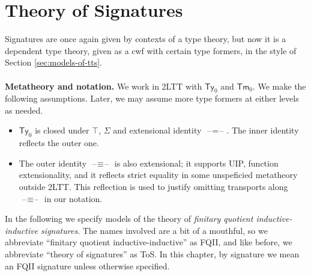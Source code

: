 \documentclass[12pt,a4paper,twoside,openany]{book}
\theoremstyle{remark}
\theoremstyle{definition}
\theoremstyle{theorem}
\newcommand{\Tm}{\mathsf{Tm}}
\newcommand{\Ty}{\mathsf{Ty}}
\newcommand{\blank}{\mathord{\hspace{1pt}\text{--}\hspace{1pt}}}
\begin{document}
\section{Theory of Signatures}
\label{sec:fqiit-tos}

Signatures are once again given by contexts of a type theory, but now it is a
dependent type theory, given as a cwf with certain type formers, in the style
of Section \ref{sec:models-of-tts}.
\\\\
\textbf{Metatheory and notation.} We work in 2LTT with $\Ty_0$ and $\Tm_0$. We
make the following assumptions. Later, we may assume more type formers at either
levels as needed.
\begin{itemize}
  \item $\Ty_0$ is closed under $\top$, $\Sigma$ and extensional identity $\blank\!=\!\blank$.
        The inner identity reflects the outer one.
  \item The outer identity $\blank\!\equiv\!\blank$ is also extensional; it supports
        UIP, function extensionality, and it reflects strict equality in some
        unspeficied metatheory outside 2LTT. This reflection is used to justify
        omitting transports along $\blank\!\equiv\!\blank$ in our notation.
\end{itemize}
In the following we specify models of the theory of \emph{finitary quotient
inductive-inductive signatures}. The names involved are a bit of a mouthful, so
we abbreviate ``finitary quotient inductive-inductive'' as FQII, and like
before, we abbreviate ``theory of signatures'' as ToS. In this chapter, by
signature we mean an FQII signature unless otherwise specified.
\end{document}

